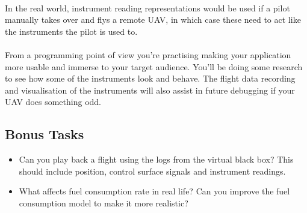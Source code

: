 \documentclass[11pt]{book}
\begin{document}
\paragraph{} In the real world, instrument reading representations would be used if a pilot manually takes over and flys a remote UAV, in which case these need to act like the instruments the pilot is used to. 

\paragraph{} From a programming point of view you're practising making your application more usable and immerse to your target audience. You'll be doing some research to see how some of the instruments look and behave. The flight data recording and visualisation of the instruments will also assist in future debugging if your UAV does something odd.

\subsection{Bonus Tasks}

\begin{itemize}
\item Can you play back a flight using the logs from the virtual black box? This should include position, control surface signals and instrument readings.
\item What affects fuel consumption rate in real life? Can you improve the fuel consumption model to make it more realistic?
\end{itemize}

\clearpage
\end{document}
